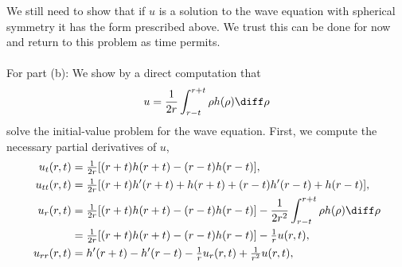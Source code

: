 \begin{solution}
  We still need to show that if \(u\) is a solution to the wave equation
  with spherical symmetry it has the form prescribed above. We trust this
  can be done for now and return to this problem as time permits.
  \\\\
  For part (b): We show by a direct computation that
  \[
    u=\frac{1}{2r}\int_{r-t}^{r+t}\rho h(\rho)\diff\rho
  \]
  solve the initial-value problem for the wave equation. First, we compute
  the necessary partial derivatives of \(u\),
  \begin{align*}
    u_t(r,t)
    &=\tfrac{1}{2r}[(r+t)h(r+t)-(r-t)h(r-t)],\\
    u_{tt}(r,t)
    &=\tfrac{1}{2r}[(r+t)h'(r+t)+h(r+t)+(r-t)h'(r-t)+h(r-t)],\\
    u_r(r,t)
    &=\tfrac{1}{2r}[(r+t)h(r+t)-(r-t)h(r-t)]
      -\frac{1}{2r^2}\int_{r-t}^{r+t}\rho h(\rho)\diff\rho\\
    &=\tfrac{1}{2r}[(r+t)h(r+t)-(r-t)h(r-t)]
      -\tfrac{1}{r}u(r,t),\\
    u_{rr}(r,t)&=h'(r+t)-h'(r-t)-\tfrac{1}{r}u_r(r,t)+\tfrac{1}{r^2}u(r,t),
  \end{align*}
\end{solution}
\newpage

